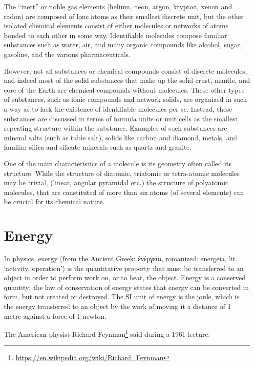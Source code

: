 \documentclass[
]{book}
\renewcommand{\href}[2]{#2\footnote{\url{#1}}}
\begin{document}
The ``inert'' or noble gas elements (helium, neon, argon, krypton, xenon and radon) are composed of lone atoms as their smallest discrete unit, but the other isolated chemical elements consist of either molecules or networks of atoms bonded to each other in some way. Identifiable molecules compose familiar substances such as water, air, and many organic compounds like alcohol, sugar, gasoline, and the various pharmaceuticals.

However, not all substances or chemical compounds consist of discrete molecules, and indeed most of the solid substances that make up the solid crust, mantle, and core of the Earth are chemical compounds without molecules. These other types of substances, such as ionic compounds and network solids, are organized in such a way as to lack the existence of identifiable molecules per se. Instead, these substances are discussed in terms of formula units or unit cells as the smallest repeating structure within the substance. Examples of such substances are mineral salts (such as table salt), solids like carbon and diamond, metals, and familiar silica and silicate minerals such as quartz and granite.

One of the main characteristics of a molecule is its geometry often called its structure. While the structure of diatomic, triatomic or tetra-atomic molecules may be trivial, (linear, angular pyramidal etc.) the structure of polyatomic molecules, that are constituted of more than six atoms (of several elements) can be crucial for its chemical nature.

\hypertarget{energy}{%
\section{Energy}\label{energy}}

In physics, energy (from the Ancient Greek: ἐνέργεια, romanized: energeia, lit. `activity, operation') is the quantitative property that must be transferred to an object in order to perform work on, or to heat, the object. Energy is a conserved quantity; the law of conservation of energy states that energy can be converted in form, but not created or destroyed. The SI unit of energy is the joule, which is the energy transferred to an object by the work of moving it a distance of 1 metre against a force of 1 newton.

The American physist \href{https://en.wikipedia.org/wiki/Richard_Feynman}{Richard Feynman} said during a 1961 lecture:
\end{document}
